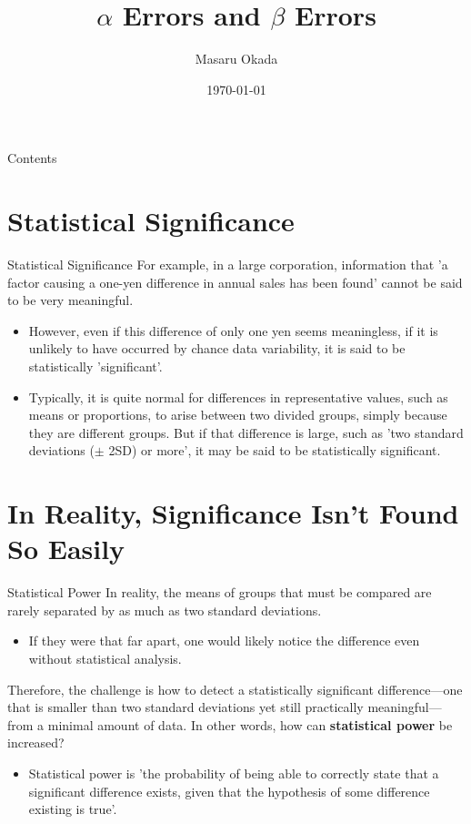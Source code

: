 \documentclass[dvipdfmx, autodetect-engine, aspectratio=169, 10.5pt]{beamer}
\title{$\alpha$ Errors and $\beta$ Errors}
\author{Masaru Okada}
\date{\today}
\begin{document}
\begin{frame}[plain]
	\titlepage
\end{frame}

\begin{frame}{Contents}
	\tableofcontents
\end{frame}

\section{Statistical Significance}

\begin{frame}{Statistical Significance}
	For example, in a large corporation, information that 'a factor causing a one-yen difference in annual sales has been found' cannot be said to be very meaningful.
	\begin{itemize}
		\item However, even if this difference of only one yen seems meaningless, if it is unlikely to have occurred by chance data variability, it is said to be statistically 'significant'.
		\item Typically, it is quite normal for differences in representative values, such as means or proportions, to arise between two divided groups, simply because they are different groups. But if that difference is large, such as 'two standard deviations ($\pm$ 2SD) or more', it may be said to be statistically significant.
	\end{itemize}
\end{frame}

\section{In Reality, Significance Isn't Found So Easily}

\begin{frame}{Statistical Power}
	In reality, the means of groups that must be compared are rarely separated by as much as two standard deviations.
	\begin{itemize}
		\item If they were that far apart, one would likely notice the difference even without statistical analysis.
	\end{itemize}
	Therefore, the challenge is how to detect a statistically significant difference—one that is smaller than two standard deviations yet still practically meaningful—from a minimal amount of data. In other words, how can \textbf{statistical power} be increased?
	\begin{itemize}
		\item Statistical power is 'the probability of being able to correctly state that a significant difference exists, given that the hypothesis of some difference existing is true'.
	\end{itemize}
\end{frame}
\end{document}
